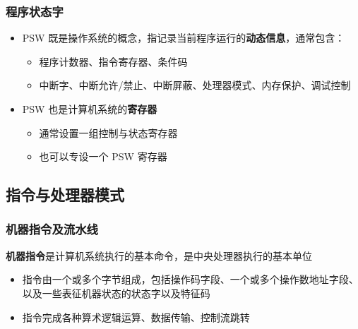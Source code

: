 \documentclass[cs4size,a4paper,10pt]{ctexart}
\begin{document}
	\subsubsection{程序状态字}
	\begin{itemize}
		\item PSW 既是操作系统的概念，指记录当前程序运行的\textbf{动态信息}，通常包含：
		\begin{itemize}
			\item 程序计数器、指令寄存器、条件码
			\item 中断字、中断允许/禁止、中断屏蔽、处理器模式、内存保护、调试控制
		\end{itemize}
		\item PSW 也是计算机系统的\textbf{寄存器}
		\begin{itemize}
			\item 通常设置一组控制与状态寄存器
			\item 也可以专设一个 PSW 寄存器
		\end{itemize}
	\end{itemize}


	\subsection{指令与处理器模式}
	\subsubsection{机器指令及流水线}
	\textbf{机器指令}是计算机系统执行的基本命令，是中央处理器执行的基本单位
	\begin{itemize}
		\item 指令由一个或多个字节组成，包括操作码字段、一个或多个操作数地址字段、以及一些表征机器状态的状态字以及特征码
		\item 指令完成各种算术逻辑运算、数据传输、控制流跳转
	\end{itemize}
\end{document}
